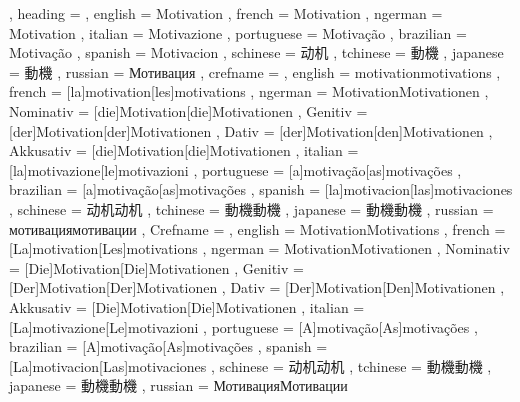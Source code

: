   {
    , heading =   {
                    , english     = Motivation
                    , french      = Motivation
                    , ngerman     = Motivation
                    , italian     = Motivazione
                    , portuguese  = Motivação
                    , brazilian   = Motivação
                    , spanish     = Motivacion
                    , schinese    = 动机
                    , tchinese    = 動機
                    , japanese    = 動機 %
                    , russian     = Мотивация
                  }
    , crefname =  {
                    , english     = {motivation}{motivations}
                    , french      = [la]{motivation}[les]{motivations}
                    , ngerman     = { {Motivation}{Motivationen}
                                      , Nominativ = [die]{Motivation}[die]{Motivationen}
                                      , Genitiv   = [der]{Motivation}[der]{Motivationen}
                                      , Dativ     = [der]{Motivation}[den]{Motivationen}
                                      , Akkusativ = [die]{Motivation}[die]{Motivationen}
                                    }
                    , italian     = [la]{motivazione}[le]{motivazioni}
                    , portuguese  = [a]{motivação}[as]{motivações}
                    , brazilian   = [a]{motivação}[as]{motivações}
                    , spanish     = [la]{motivacion}[las]{motivaciones}
                    , schinese    = {动机}{动机}
                    , tchinese    = {動機}{動機}
                    , japanese    = {動機}{動機}
                    , russian     = {мотивация}{мотивации}
                  }
    , Crefname =  {
                    , english     = {Motivation}{Motivations}
                    , french      = [La]{motivation}[Les]{motivations}
                    , ngerman     = { {Motivation}{Motivationen}
                                      , Nominativ = [Die]{Motivation}[Die]{Motivationen}
                                      , Genitiv   = [Der]{Motivation}[Der]{Motivationen}
                                      , Dativ     = [Der]{Motivation}[Den]{Motivationen}
                                      , Akkusativ = [Die]{Motivation}[Die]{Motivationen}
                                    }
                    , italian     = [La]{motivazione}[Le]{motivazioni}
                    , portuguese  = [A]{motivação}[As]{motivações}
                    , brazilian   = [A]{motivação}[As]{motivações}
                    , spanish     = [La]{motivacion}[Las]{motivaciones}
                    , schinese    = {动机}{动机}
                    , tchinese    = {動機}{動機}
                    , japanese    = {動機}{動機}
                    , russian     = {Мотивация}{Мотивации}
                  }
  }

